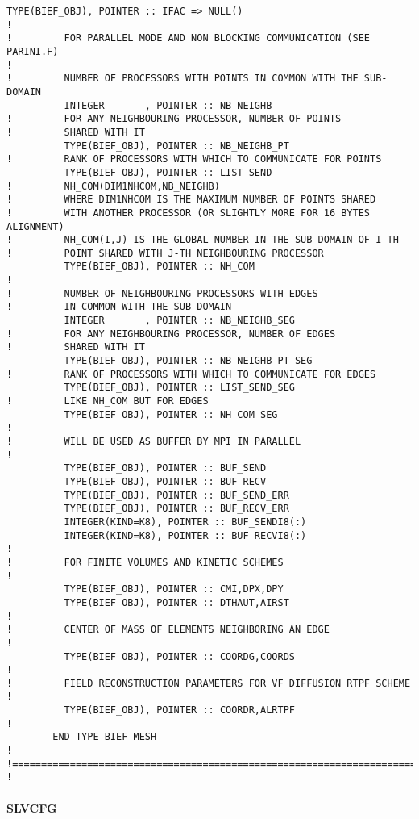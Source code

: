 \begin{lstlisting}[language=TelFortran]
          TYPE(BIEF_OBJ), POINTER :: IFAC => NULL()
!
!         FOR PARALLEL MODE AND NON BLOCKING COMMUNICATION (SEE PARINI.F)
!
!         NUMBER OF PROCESSORS WITH POINTS IN COMMON WITH THE SUB-DOMAIN
          INTEGER       , POINTER :: NB_NEIGHB
!         FOR ANY NEIGHBOURING PROCESSOR, NUMBER OF POINTS
!         SHARED WITH IT
          TYPE(BIEF_OBJ), POINTER :: NB_NEIGHB_PT
!         RANK OF PROCESSORS WITH WHICH TO COMMUNICATE FOR POINTS
          TYPE(BIEF_OBJ), POINTER :: LIST_SEND
!         NH_COM(DIM1NHCOM,NB_NEIGHB)
!         WHERE DIM1NHCOM IS THE MAXIMUM NUMBER OF POINTS SHARED
!         WITH ANOTHER PROCESSOR (OR SLIGHTLY MORE FOR 16 BYTES ALIGNMENT)
!         NH_COM(I,J) IS THE GLOBAL NUMBER IN THE SUB-DOMAIN OF I-TH
!         POINT SHARED WITH J-TH NEIGHBOURING PROCESSOR
          TYPE(BIEF_OBJ), POINTER :: NH_COM
!
!         NUMBER OF NEIGHBOURING PROCESSORS WITH EDGES
!         IN COMMON WITH THE SUB-DOMAIN
          INTEGER       , POINTER :: NB_NEIGHB_SEG
!         FOR ANY NEIGHBOURING PROCESSOR, NUMBER OF EDGES
!         SHARED WITH IT
          TYPE(BIEF_OBJ), POINTER :: NB_NEIGHB_PT_SEG
!         RANK OF PROCESSORS WITH WHICH TO COMMUNICATE FOR EDGES
          TYPE(BIEF_OBJ), POINTER :: LIST_SEND_SEG
!         LIKE NH_COM BUT FOR EDGES
          TYPE(BIEF_OBJ), POINTER :: NH_COM_SEG
!
!         WILL BE USED AS BUFFER BY MPI IN PARALLEL
!
          TYPE(BIEF_OBJ), POINTER :: BUF_SEND
          TYPE(BIEF_OBJ), POINTER :: BUF_RECV
          TYPE(BIEF_OBJ), POINTER :: BUF_SEND_ERR
          TYPE(BIEF_OBJ), POINTER :: BUF_RECV_ERR
          INTEGER(KIND=K8), POINTER :: BUF_SENDI8(:)
          INTEGER(KIND=K8), POINTER :: BUF_RECVI8(:)
!
!         FOR FINITE VOLUMES AND KINETIC SCHEMES
!
          TYPE(BIEF_OBJ), POINTER :: CMI,DPX,DPY
          TYPE(BIEF_OBJ), POINTER :: DTHAUT,AIRST
!
!         CENTER OF MASS OF ELEMENTS NEIGHBORING AN EDGE
!
          TYPE(BIEF_OBJ), POINTER :: COORDG,COORDS
!
!         FIELD RECONSTRUCTION PARAMETERS FOR VF DIFFUSION RTPF SCHEME
!
          TYPE(BIEF_OBJ), POINTER :: COORDR,ALRTPF
!
        END TYPE BIEF_MESH
!
!=======================================================================
!
\end{lstlisting}

\paragraph{SLVCFG}

